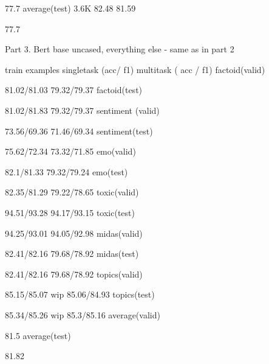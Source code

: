77.7
average(test)
3.6K
82.48
81.59




77.7










Part 3. Bert base uncased, everything else - same as in part 2




train examples
singletask (acc/ f1)
multitask
( acc / f1)
factoid(valid)


81.02/81.03
79.32/79.37
factoid(test)


81.02/81.83
79.32/79.37
sentiment (valid)


73.56/69.36
71.46/69.34
sentiment(test)


75.62/72.34
73.32/71.85
emo(valid)


82.1/81.33
79.32/79.24
emo(test)


82.35/81.29
79.22/78.65
toxic(valid)


94.51/93.28
94.17/93.15
toxic(test)


94.25/93.01
94.05/92.98
midas(valid)


82.41/82.16
79.68/78.92
midas(test)


82.41/82.16
79.68/78.92
topics(valid)


85.15/85.07 wip
85.06/84.93
topics(test)


85.34/85.26 wip
85.3/85.16
average(valid)




81.5
average(test)




81.82







